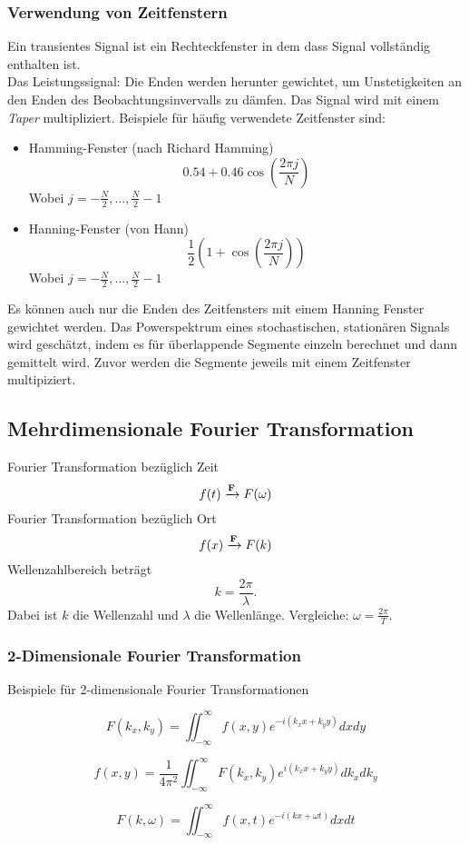 \subsubsection*{Verwendung von Zeitfenstern}
Ein transientes Signal ist ein Rechteckfenster in dem dass Signal vollständig enthalten ist.\\
Das Leistungssignal: Die Enden werden herunter gewichtet, um Unstetigkeiten an den Enden des Beobachtungsinvervalls zu dämfen. Das Signal wird mit einem \textit{Taper} multipliziert. Beispiele für häufig verwendete Zeitfenster sind:
\begin{itemize}
\item Hamming-Fenster (nach Richard Hamming)
\[
0.54+0.46\cos \left(\frac{2\pi j}{N} \right)
\]
{\small Wobei $j=-\frac{N}{2},\dots, \frac{N}{2}-1$}
\item Hanning-Fenster (von Hann)
\[
\frac{1}{2}\left(1+\cos\left(\frac{2\pi j}{N}\right)\right)
\]
{\small Wobei $j=-\frac{N}{2},\dots, \frac{N}{2}-1$}
\end{itemize}
Es können auch nur die Enden des Zeitfensters mit einem Hanning Fenster gewichtet werden.
Das Powerspektrum eines stochastischen, stationären Signals wird geschätzt, indem es für überlappende Segmente einzeln berechnet und dann gemittelt wird. Zuvor werden die Segmente jeweils mit einem Zeitfenster multipiziert.

\subsection{Mehrdimensionale Fourier Transformation}
Fourier Transformation bezüglich Zeit
\[
f(t) \xrightarrow {\bf F} F(\omega)
\]
Fourier Transformation bezüglich Ort
\[
f(x) \xrightarrow {\bf F} F(k)
\]
Wellenzahlbereich beträgt 
\[
k=\frac{2\pi}{\lambda}.
\]
{\small Dabei ist $k$ die Wellenzahl und $\lambda$ die Wellenlänge.}
Vergleiche: $ \omega =\frac{2\pi}{T}$.

\subsubsection{2-Dimensionale Fourier Transformation}
Beispiele für 2-dimensionale Fourier Transformationen

\[
F(k_x,k_y)=\iint_{-\infty}^\infty f(x,y)e^{-i(k_xx+k_yy)} dx dy
\]

\[
f(x,y)=\frac{1}{4\pi^2} \iint_{-\infty}^\infty F(k_x,k_y)e^{i(k_xx+k_yy)} dk_x dk_y
\]

\[
F(k,\omega)=\iint_{-\infty}^\infty f(x,t)e^{-i(kx+\omega t)} dx dt
\]


